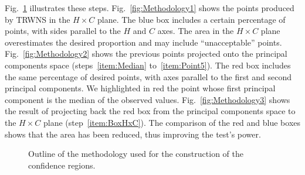 \documentclass[alpha-refs]{wiley-article}
\begin{document}
Fig.~\ref{fig:methodology} illustrates these steps.
%
Fig.~\ref{fig:Methodology1} shows the points produced by TRWNS in the $H\times C$ plane.
The blue box includes a certain percentage of points, with sides parallel to the $H$ and $C$ axes.
The area in the $H\times C$ plane overestimates the desired proportion and may include ``unacceptable'' points.
%
Fig.~\ref{fig:Methodology2} shows the previous points projected onto the principal components space (steps~\ref{item:Median} to~\ref{item:Point5}).
The red box includes the same percentage of desired points, with axes parallel to the first and second principal components.
We highlighted in red the point whose first principal component is the median of the observed values.
%
Fig.~\ref{fig:Methodology3} shows the result of projecting back the red box from the principal components space to the $H\times C$ plane (step~\ref{item:BoxHxC}).
The comparison of the red and blue boxes shows that the area has been reduced, thus improving the test's power.

\begin{figure}[hbt]
\centering
\caption{Outline of the methodology used for the construction of the confidence regions.}
\label{fig:methodology}
\end{figure}
\end{document}
